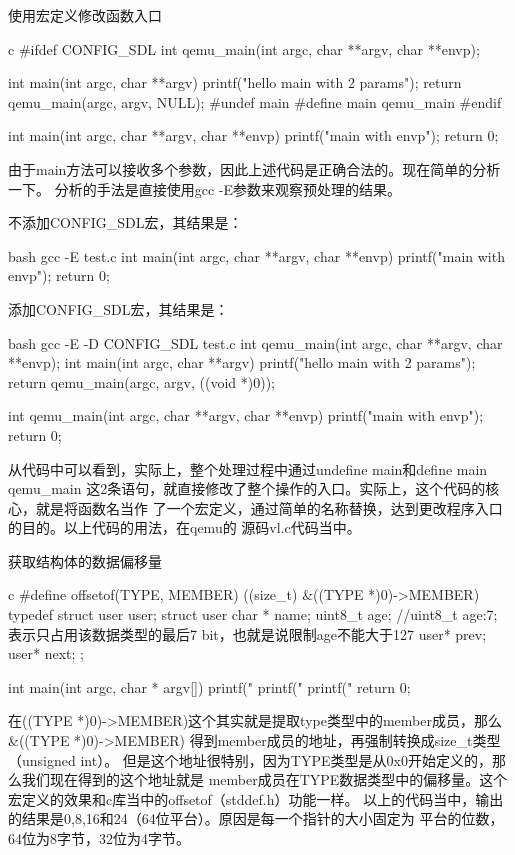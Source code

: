 \begin{outline}[enumerate]
\1 使用宏定义修改函数入口
\begin{code-in-enumerate}{c}
#ifdef CONFIG_SDL
int qemu_main(int argc, char **argv, char **envp);

int main(int argc, char **argv)
{
    printf("hello main with 2 params\n");
    return qemu_main(argc, argv, NULL);
}
#undef main
#define main qemu_main
#endif

int main(int argc, char **argv, char **envp)
{
    printf("main with envp\n");
    return 0;
}
\end{code-in-enumerate}
由于main方法可以接收多个参数，因此上述代码是正确合法的。现在简单的分析一下。
分析的手法是直接使用gcc -E参数来观察预处理的结果。

不添加CONFIG\_SDL宏，其结果是：
\begin{code-in-enumerate}{bash}
gcc -E test.c
int main(int argc, char **argv, char **envp)
{
    printf("main with envp\n");
    return 0;
}
\end{code-in-enumerate}
添加CONFIG\_SDL宏，其结果是：
\begin{code-in-enumerate}{bash}
gcc -E -D CONFIG_SDL test.c
int qemu_main(int argc, char **argv, char **envp);
int main(int argc, char **argv)
{
    printf("hello main with 2 params\n");
    return qemu_main(argc, argv, ((void *)0));
}

int qemu_main(int argc, char **argv, char **envp)
{
    printf("main with envp\n");
    return 0;
}
\end{code-in-enumerate}
从代码中可以看到，实际上，整个处理过程中通过undefine main和define main qemu\_main
这2条语句，就直接修改了整个操作的入口。实际上，这个代码的核心，就是将函数名当作
了一个宏定义，通过简单的名称替换，达到更改程序入口的目的。以上代码的用法，在qemu的
源码vl.c代码当中。

\1 获取结构体的数据偏移量
\begin{code-in-enumerate}{c}
#define offsetof(TYPE, MEMBER) ((size_t) &((TYPE *)0)->MEMBER)
typedef struct user user;
struct user{
    char * name;
    uint8_t age;
    //uint8_t age:7; 表示只占用该数据类型的最后7 bit，也就是说限制age不能大于127
    user* prev;
    user* next;
};

int main(int argc, char * argv[])
{
    printf("%
    printf("%
    printf("%
    return 0;
}
\end{code-in-enumerate}

在((TYPE *)0)->MEMBER)这个其实就是提取type类型中的member成员，那么\&((TYPE *)0)->MEMBER)
得到member成员的地址，再强制转换成size\_t类型（unsigned int）。
但是这个地址很特别，因为TYPE类型是从0x0开始定义的，那么我们现在得到的这个地址就是
member成员在TYPE数据类型中的偏移量。这个宏定义的效果和c库当中的offsetof（stddef.h）功能一样。
以上的代码当中，输出的结果是0,8,16和24（64位平台）。原因是每一个指针的大小固定为
平台的位数，64位为8字节，32位为4字节。


\end{outline}
